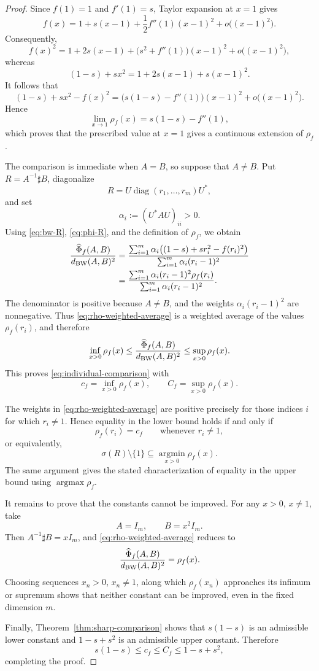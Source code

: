 \documentclass[11pt]{amsart}
\theoremstyle{definition}
\theoremstyle{remark}
\newcommand{\altPhi}{\widehat{\Phi}}
\begin{document}
\begin{proof}
	Since $f(1)=1$ and $f'(1)=s$, Taylor expansion at $x=1$
	gives
	\[
	f(x)
	=1+s(x-1)+\frac12f''(1)(x-1)^2
	+o\bigl((x-1)^2\bigr).
	\]
	Consequently,
	\[
	f(x)^2
	=1+2s(x-1)
	+\bigl(s^2+f''(1)\bigr)(x-1)^2
	+o\bigl((x-1)^2\bigr),
	\]
	whereas
	\[
	(1-s)+sx^2
	=1+2s(x-1)+s(x-1)^2.
	\]
	It follows that
	\[
	(1-s)+sx^2-f(x)^2
	=
	\bigl(s(1-s)-f''(1)\bigr)(x-1)^2
	+o\bigl((x-1)^2\bigr).
	\]
	Hence
	\[
	\lim_{x\to1}\rho_f(x)
	=s(1-s)-f''(1),
	\]
	which proves that the prescribed value at $x=1$ gives a continuous
	extension of $\rho_f$.
	
	The comparison is immediate when $A=B$, so suppose that $A\ne B$.
	Put $R=A^{-1}\sharp B$, diagonalize
	\[
	R=U\operatorname{diag}(r_1,\ldots,r_m)U^*,
	\]
	and set
	\[
	\alpha_i:=(U^*AU)_{ii}>0.
	\]
	Using \eqref{eq:bw-R}, \eqref{eq:phi-R}, and the definition of
	$\rho_f$, we obtain
	\begin{align}
		\frac{\altPhi_f(A,B)}{d_{\rm BW}(A,B)^2}
		&=
		\frac{
			\sum_{i=1}^m
			\alpha_i\bigl((1-s)+sr_i^2-f(r_i)^2\bigr)
		}{
			\sum_{i=1}^m\alpha_i(r_i-1)^2
		}\notag\\
		&=
		\frac{
			\sum_{i=1}^m
			\alpha_i(r_i-1)^2\rho_f(r_i)
		}{
			\sum_{i=1}^m\alpha_i(r_i-1)^2
		}.
		\label{eq:rho-weighted-average}
	\end{align}
	The denominator is positive because $A\ne B$, and the weights
	$\alpha_i(r_i-1)^2$ are nonnegative. Thus
	\eqref{eq:rho-weighted-average} is a weighted average of the values
	$\rho_f(r_i)$, and therefore
	\[
	\inf_{x>0}\rho_f(x)
	\le
	\frac{\altPhi_f(A,B)}{d_{\rm BW}(A,B)^2}
	\le
	\sup_{x>0}\rho_f(x).
	\]
	This proves \eqref{eq:individual-comparison} with
	\[
	c_f=\inf_{x>0}\rho_f(x),
	\qquad
	C_f=\sup_{x>0}\rho_f(x).
	\]
	
	The weights in \eqref{eq:rho-weighted-average} are positive precisely
	for those indices $i$ for which $r_i\ne1$. Hence equality in the
	lower bound holds if and only if
	\[
	\rho_f(r_i)=c_f
	\qquad\text{whenever }r_i\ne1,
	\]
	or equivalently,
	\[
	\sigma(R)\setminus\{1\}
	\subseteq\operatorname*{argmin}_{x>0}\rho_f(x).
	\]
	The same argument gives the stated characterization of equality in the
	upper bound using $\operatorname*{argmax}\rho_f$.
	
	It remains to prove that the constants cannot be improved. For any
	$x>0$, $x\ne1$, take
	\[
	A=I_m,
	\qquad
	B=x^2I_m.
	\]
	Then $A^{-1}\sharp B=xI_m$, and
	\eqref{eq:rho-weighted-average} reduces to
	\[
	\frac{\altPhi_f(A,B)}{d_{\rm BW}(A,B)^2}
	=\rho_f(x).
	\]
	Choosing sequences $x_n>0$, $x_n\ne1$, along which
	$\rho_f(x_n)$ approaches its infimum or supremum shows that neither
	constant can be improved, even in the fixed dimension $m$.
	
	Finally, Theorem~\ref{thm:sharp-comparison} shows that
	$s(1-s)$ is an admissible lower constant and $1-s+s^2$ is an
	admissible upper constant. Therefore
	\[
	s(1-s)\le c_f\le C_f\le1-s+s^2,
	\]
	completing the proof.
\end{proof}
	
\end{document}
